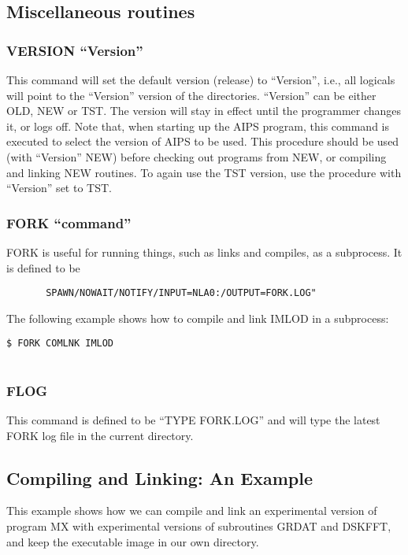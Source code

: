 \subsection{Miscellaneous routines}

\subsubsection{VERSION ``Version''}
This command will set the default version (release) to ``Version'',
i.e., all logicals will point to the ``Version'' version of the
directories.  ``Version'' can be either OLD, NEW or TST.  The version
will stay in effect until the programmer changes it, or logs off.
Note that, when starting up the AIPS program, this command is executed
to select the version of AIPS to be used.  This procedure should be
used (with ``Version'' NEW) before checking out programs from NEW, or
compiling and linking NEW routines.  To again use the TST version, use
the procedure with ``Version'' set to TST.


\subsubsection{FORK ``command''}
FORK is useful for running things, such as links and compiles, as a
subprocess.  It is defined to be

\begin{verbatim}
       SPAWN/NOWAIT/NOTIFY/INPUT=NLA0:/OUTPUT=FORK.LOG"

\end{verbatim}
The following example shows how to compile and link IMLOD in a
subprocess:

\begin{verbatim}
$ FORK COMLNK IMLOD


\end{verbatim}

\subsubsection{FLOG }
This command is defined to be ``TYPE FORK.LOG'' and will type the latest
FORK log file in the current directory.

\subsection{Compiling and Linking: An Example}


This example shows how we can compile and link an experimental version
of program MX with experimental versions of subroutines GRDAT and
DSKFFT, and keep the executable image in our own directory.

